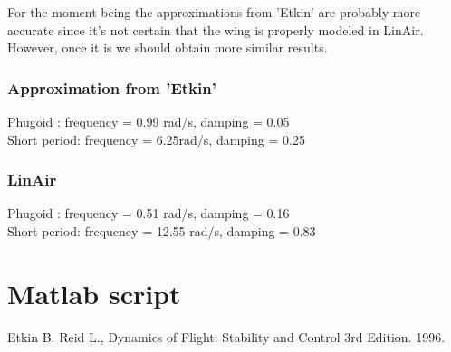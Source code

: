 \documentclass[titlepage,10pt]{article}
\begin{document}
For the moment being the approximations from 'Etkin' are probably more accurate since it's not certain that the wing is properly modeled in LinAir. However, once it is we should obtain more similar results.

\subsubsection{Approximation from 'Etkin'}
Phugoid     :  frequency = 0.99 rad/s,  damping = 0.05 \\
Short period:  frequency = 6.25rad/s, damping = 0.25 
\subsubsection{LinAir}
Phugoid     :  frequency = 0.51 rad/s,  damping = 0.16 \\
Short period:  frequency = 12.55 rad/s, damping = 0.83 

\newpage
\appendix
\section{Matlab script}

\begin{thebibliography}{9}
  Etkin B. Reid L.,
  Dynamics of Flight: Stability and Control
  3rd Edition.
  1996.
  
  
\end{thebibliography}
\end{document}
